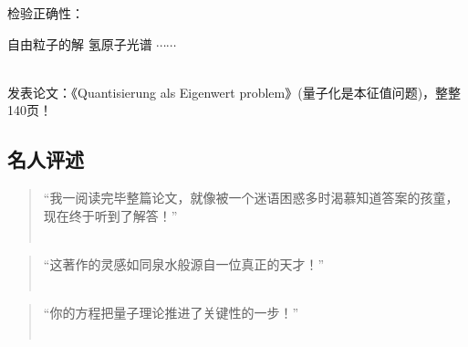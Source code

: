 \begin{frame}
    \frametitle{}
    检验正确性：
    \begin{enumerate}
        \Item 自由粒子的解
        \Item 氢原子光谱
        \Item $\cdots \cdots$
    \end{enumerate}
    ~\\ 
    发表论文：《Quantisierung als Eigenwert problem》(量子化是本征值问题)，整整140页！
\end{frame}

\subsection{名人评述}

\begin{frame}
    \begin{enumerate}
        \Item 
        \begin{quote}
            “我一阅读完毕整篇论文，就像被一个迷语困惑多时渴慕知道答案的孩童，现在终于听到了解答！” \\
            ~~\\
        \end{quote}  
        \Item 
        \begin{quote}
            “这著作的灵感如同泉水般源自一位真正的天才！” \\
            ~~\\
        \end{quote}  
        \Item  
        \begin{quote}
            “你的方程把量子理论推进了关键性的一步！” \\
            ~~\\
        \end{quote} 
    \end{enumerate}
\end{frame}

